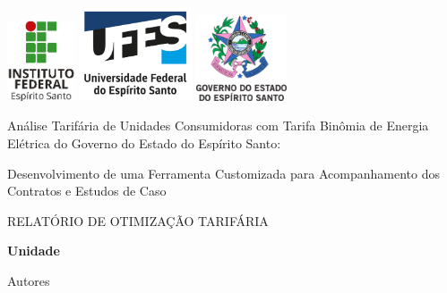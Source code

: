 \documentclass[a4paper,12pt]{abntex2}
\begin{document}
\cleardoublepage
\thispagestyle{empty}
\vspace*{0pt}
    \begin{center}
        \includegraphics[width=0.15\textwidth,trim={0.0cm 0.0cm 0.0cm 0.0cm},clip]{templates/LOGOS/IFESlogo.jpg} 
        \hspace{2.0cm}
        \includegraphics[width=0.25\textwidth,trim={0.0cm 0.5cm 0.0cm 0.0cm},clip]{templates/LOGOS/marca_ufes2_0} 
        \hspace{2.0cm}
        \includegraphics[width=0.20\textwidth,trim={0.0cm 0.0cm 0.0cm 0.0cm},clip]{templates/LOGOS/Brasao_Governo_1024.png}
    
    
    \vspace{1cm}
    \noindent
    \Large{Análise Tarifária de Unidades Consumidoras com Tarifa Binômia de Energia Elétrica do Governo do Estado do Espírito Santo:}

    \vspace{0.25cm}
    \small{Desenvolvimento de uma Ferramenta Customizada para Acompanhamento dos Contratos e Estudos de Caso}

    \vspace{2.0cm}
    \large{RELATÓRIO DE OTIMIZAÇÃO TARIFÁRIA}

    \textbf{ {{ Unidade }} }

    \vspace{0.15cm}
    
    \small{ {{ Autores }} }
\end{center}  
    \vspace{3cm}

    \noindent
\end{document}
